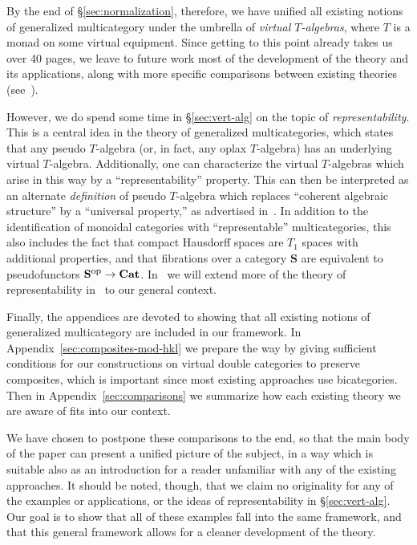 \documentclass{tac}
\newcommand{\mb}[1]{{\mathbf{#1}}}
\newcommand{\op}{\mbox{\scriptsize op}}
\numberwithin{equation}{section}
\begin{document}
By the end of \S\ref{sec:normalization}, therefore, we have unified all
existing notions of generalized multicategory under the umbrella of
\emph{virtual $T$-algebras}, where $T$ is a monad on some virtual
equipment.  Since getting to this point already takes us over 40 pages,
we leave to future work most of the development of the theory and its
applications, along with more specific comparisons between existing
theories (see~\cite{cs:functoriality,cs:laxidem}).

However, we do spend some time in \S\ref{sec:vert-alg} on the topic of
\emph{representability}.  This is a central idea in the theory of
generalized multicategories, which states that any pseudo $T$-algebra
(or, in fact, any oplax $T$-algebra) has an underlying virtual
$T$-algebra.  Additionally, one can characterize the virtual
$T$-algebras which arise in this way by a ``representability'' property.
This can then be interpreted as an alternate \emph{definition} of pseudo
$T$-algebra which replaces ``coherent algebraic structure'' by a
``universal property,'' as advertised in~\cite{HermidaCoherent}.  In
addition to the identification of monoidal categories with
``representable'' multicategories, this also includes the fact that
compact Hausdorff spaces are $T_1$ spaces with additional properties,
and that fibrations over a category $\mb{S}$ are equivalent to
pseudofunctors $\mb{S}^{\op} \to \mb{Cat}$.  In~\cite{cs:laxidem} we
will extend more of the theory of representability
in~\cite{HermidaCoherent} to our general context.

Finally, the appendices are devoted to showing that all existing notions of
generalized multicategory are included in our framework.  In
Appendix~\ref{sec:composites-mod-hkl} we prepare the way by giving
sufficient conditions for our constructions on virtual double
categories to preserve composites, which is important since most
existing approaches use bicategories.  Then in
Appendix~\ref{sec:comparisons} we summarize how each existing theory
we are aware of fits into our context.

We have chosen to postpone these comparisons to the end, so that the
main body of the paper can present a unified picture of the subject,
in a way which is suitable also as an introduction for a reader
unfamiliar with any of the existing approaches.  It should be noted,
though, that we claim no originality for any of the examples or
applications, or the ideas of representability in
\S\ref{sec:vert-alg}.  Our goal is to show that all of these examples
fall into the same framework, and that this general framework allows for
a cleaner development of the theory.
\end{document}
